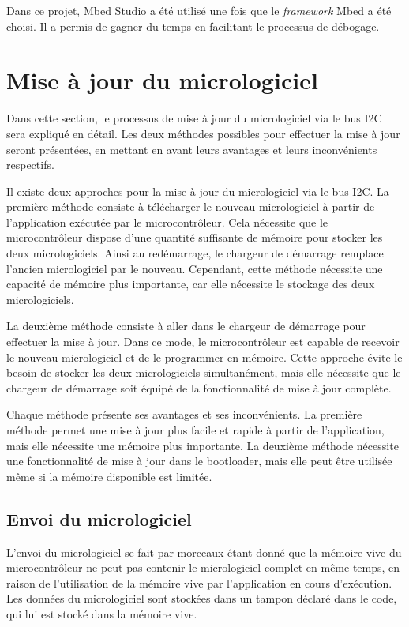 Dans ce projet, Mbed Studio a été utilisé une fois que le \textit{\gls{framework}} Mbed a été choisi.
Il a permis de gagner du temps en facilitant le processus de débogage.

\section{Mise à jour du micrologiciel}

Dans cette section, le processus de mise à jour du micrologiciel via le bus I2C sera expliqué en détail.
Les deux méthodes possibles pour effectuer la mise à jour seront présentées, en mettant en avant leurs avantages et leurs inconvénients respectifs.

Il existe deux approches pour la mise à jour du micrologiciel via le bus I2C.
La première méthode consiste à télécharger le nouveau micrologiciel à partir de l'application exécutée par le microcontrôleur.
Cela nécessite que le microcontrôleur dispose d'une quantité suffisante de mémoire pour stocker les deux micrologiciels.
Ainsi au redémarrage, le chargeur de démarrage remplace l'ancien micrologiciel par le nouveau.
Cependant, cette méthode nécessite une capacité de mémoire plus importante, car elle nécessite le stockage des deux micrologiciels.

La deuxième méthode consiste à aller dans le chargeur de démarrage pour effectuer la mise à jour.
Dans ce mode, le microcontrôleur est capable de recevoir le nouveau micrologiciel et de le programmer en mémoire.
Cette approche évite le besoin de stocker les deux micrologiciels simultanément, mais elle nécessite que le chargeur de démarrage soit équipé de la fonctionnalité de mise à jour complète.

Chaque méthode présente ses avantages et ses inconvénients.
La première méthode permet une mise à jour plus facile et rapide à partir de l'application, mais elle nécessite une mémoire plus importante.
La deuxième méthode nécessite une fonctionnalité de mise à jour dans le bootloader, mais elle peut être utilisée même si la mémoire disponible est limitée.

\subsection{Envoi du micrologiciel}

L'envoi du micrologiciel se fait par morceaux étant donné que la mémoire vive du microcontrôleur ne peut pas contenir le micrologiciel complet en même temps, en raison de l'utilisation de la mémoire vive par l'application en cours d'exécution.
Les données du micrologiciel sont stockées dans un tampon déclaré dans le code, qui lui est stocké dans la mémoire vive.

